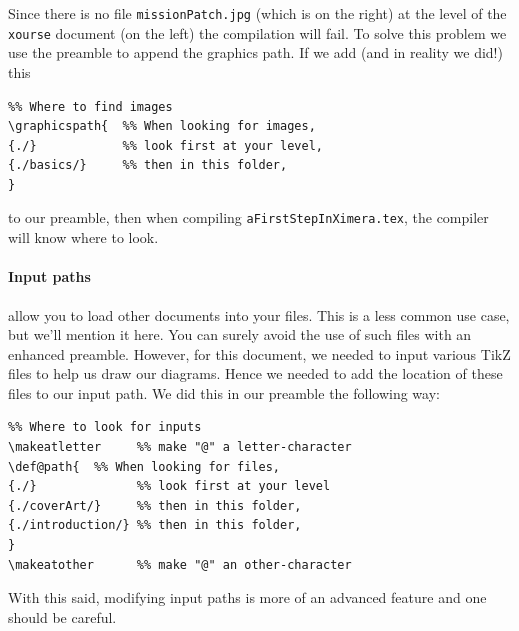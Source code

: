 \documentclass{ximera}
\begin{document}
Since there is no file \verb!missionPatch.jpg! (which is on the right) at the
level of the
\verb!xourse! document (on the left) the compilation will fail. To solve this
problem we use the preamble to append the graphics path. If we add (and in
reality we did!) this
\begin{verbatim}
%% Where to find images
\graphicspath{  %% When looking for images,
{./}            %% look first at your level,
{./basics/}     %% then in this folder,
}    
\end{verbatim}
to our preamble, then when compiling \verb!aFirstStepInXimera.tex!, the
compiler will know where to look.

\paragraph{Input paths} allow you to load other documents into your files. 
This is a less common use case, but we'll mention it here. You can surely avoid the use of such files with an enhanced preamble. However, for this document, we
needed to input various TikZ files to help us draw our diagrams. Hence we needed to
add the location of these files to our input path. We did this in our preamble
the following way:
\begin{verbatim}
%% Where to look for inputs
\makeatletter     %% make "@" a letter-character
\def@path{  %% When looking for files,
{./}              %% look first at your level
{./coverArt/}     %% then in this folder,
{./introduction/} %% then in this folder,
}
\makeatother      %% make "@" an other-character
\end{verbatim}
With this said, modifying input paths is more of an advanced feature and one should be careful.
\end{document}
